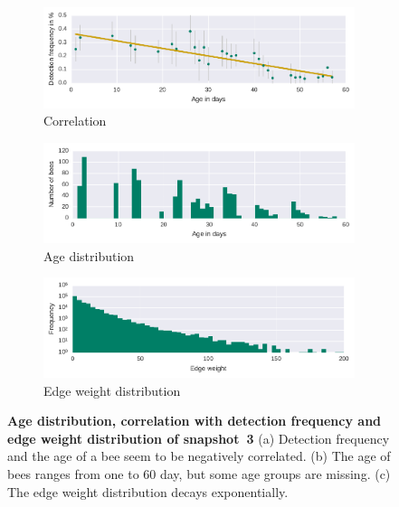 \begin{figure}[bp]
	\centering
	\begin{subfigure}[b]{1\textwidth}
	\centering
	\includegraphics[width=1.0\textwidth]{Figures/n3_detFvsAge}
	\caption[Correlation]{Correlation}
	\label{fig:n3detfVSage}
	\end{subfigure} 
	\begin{subfigure}[b]{1\textwidth}
	\centering
	\includegraphics[width=1.0\textwidth]{Figures/n3_ages.pdf}
	\caption[Age distribution]{Age distribution}
	\label{fig:n3ageDist}
	\end{subfigure}
	\begin{subfigure}[b]{1\textwidth}
	\centering
	\includegraphics[width=1.0\textwidth]{Figures/n3-edgeWeightDist.pdf}
	\caption[Edge weight distribution]{Edge weight distribution}
	\label{fig:edgeWdist}
	\end{subfigure}
	\caption[Age distribution, correlation with detection frequency and edge weight distribution of snapshot~3]{\textbf{Age distribution, correlation with detection frequency and edge weight distribution of snapshot~3} (a) Detection frequency and the age of a bee seem to be negatively correlated. (b) The age of bees ranges from one to 60 day, but some age groups are missing. (c) The edge weight distribution decays exponentially.}
	\label{fig:ageDetF}
\end{figure}